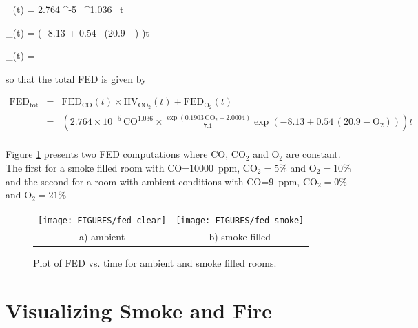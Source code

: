 \documentclass[11pt,twoside]{book}
\begin{document}
\be {}_(t) = 2.764 ^{-5} \,
^{1.036} \, t \label{eq:fedCOcons} \ee

\be {}_(t) =   \exp( -8.13 + 0.54 \, (20.9 -
) )t \label{eq:fedO2cons} \ee

\be
{}_(t) = 
\label{eq:fedCO2cons}
\ee

so that the total FED is given by

\begin{eqnarray}
\mathrm{FED}_\mathrm{tot}
&= &\mathrm{FED}_\mathrm{CO}(t)\times\mathrm{HV}_\mathrm{CO_2}(t)+\mathrm{FED}_\mathrm{O_2}(t)\\
\nonumber
 &= &\left(2.764 \times 10^{-5} \, \mathrm{CO}^{1.036}\times
\frac{ \exp( 0.1903 \, \mathrm{CO_2} +  2.0004 ) }{7.1}\exp( -8.13
+ 0.54 \, (20.9 - \mathrm{O_2}) )\right) t\\
\end{eqnarray}

Figure \ref{fig:fedplot} presents two FED computations where CO,
$\mathrm{CO_2}$ and $\mathrm{O_2}$ are constant.
The first for a smoke filled room with CO=\SI{10000}{ppm},
$\mathrm{CO_2}=5 \%$ and $\mathrm{O_2}=10 \%$ and the second for a
room with ambient conditions with CO=\SI{9}{ppm},
$\mathrm{CO_2}=0 \%$ and $\mathrm{O_2}=21 \%$

\begin{figure}[\figoptions]
\begin{center}
\begin{tabular}{cc}
\texttt{[image: FIGURES/fed\_clear]}&
\texttt{[image: FIGURES/fed\_smoke]}\\
a) ambient&b) smoke filled\\
\end{tabular}
\end{center}
\caption{Plot of FED vs. time for ambient and smoke filled rooms.}
\label{fig:fedplot}%
\end{figure}

%
%

\chapter{Visualizing Smoke and Fire}

\newcommand{\citesmv}{\cite{Smokeview_Users_Guide}}
\newcommand{\paper}{chapter}

%
%
\end{document}

